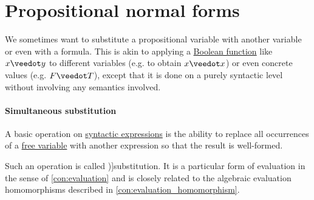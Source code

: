 \section{Propositional normal forms}\label{sec:propositional_normal_forms}

We sometimes want to substitute a propositional variable with another variable or even with a formula. This is akin to applying a \hyperref[def:boolean_function]{Boolean function} like \( x \synvee y \) to different variables (e.g. to obtain \( x \synvee x \)) or even concrete values (e.g. \( F \synvee T \)), except that it is done on a purely syntactic level without involving any semantics involved.

\paragraph{Simultaneous substitution}

\begin{concept}\label{con:syntactic_substitution}
  A basic operation on \hyperref[con:expression]{syntactic expressions} is the ability to replace all occurrences of a \hyperref[con:variable_binding]{free variable} with another expression so that the result is well-formed.

  Such an operation is called \term[en=substitution (\cite[78]{Kleene1971Metamathematics})]{substitution}. It is a particular form of evaluation in the sense of \cref{con:evaluation} and is closely related to the algebraic evaluation homomorphisms described in \cref{con:evaluation_homomorphism}.
\end{concept}

